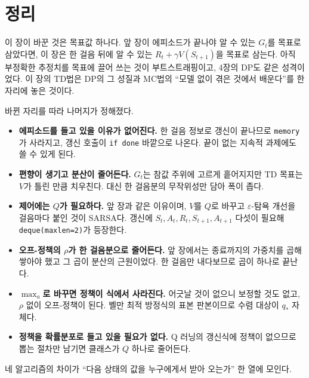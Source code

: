 \documentclass[11pt,a4paper]{article}
\begin{document}
\section{정리}
\label{sec:summary}

이 장이 바꾼 것은 목표값 하나다. 앞 장이 에피소드가 끝나야 알 수 있는 $G_t$를 목표로 삼았다면,
이 장은 한 걸음 뒤에 알 수 있는 $R_t + \gamma V(S_{t+1})$을 목표로 삼는다. 아직 부정확한 추정치를
목표에 끌어 쓰는 것이 부트스트래핑이고, 4장의 DP도 같은 성격이었다. 이 장의 TD법은 DP의 그
성질과 MC법의 ``모델 없이 겪은 것에서 배운다''를 한자리에 놓은 것이다.

바뀐 자리를 따라 나머지가 정해졌다.

\begin{itemize}[leftmargin=*,itemsep=3pt]
  \item \textbf{에피소드를 들고 있을 이유가 없어진다.} 한 걸음 정보로 갱신이 끝나므로
        \lstinline|memory|가 사라지고, 갱신 호출이 \lstinline|if done| 바깥으로 나온다. 끝이 없는
        지속적 과제에도 쓸 수 있게 된다.
  \item \textbf{편향이 생기고 분산이 줄어든다.} $G_t$는 참값 주위에 고르게 흩어지지만 TD 목표는
        $V$가 틀린 만큼 치우친다. 대신 한 걸음분의 무작위성만 담아 폭이 좁다.
  \item \textbf{제어에는 $Q$가 필요하다.} 앞 장과 같은 이유이며, $V$를 $Q$로 바꾸고
        $\varepsilon$-탐욕 개선을 걸음마다 붙인 것이 SARSA다. 갱신에
        $S_t, A_t, R_t, S_{t+1}, A_{t+1}$ 다섯이 필요해 \lstinline|deque(maxlen=2)|가 등장한다.
  \item \textbf{오프-정책의 $\rho$가 한 걸음분으로 줄어든다.} 앞 장에서는 종료까지의 가중치를
        곱해 쌓아야 했고 그 곱이 분산의 근원이었다. 한 걸음만 내다보므로 곱이 하나로 끝난다.
  \item \textbf{$\max_a$로 바꾸면 정책이 식에서 사라진다.} 어긋날 것이 없으니 보정할 것도 없고,
        $\rho$ 없이 오프-정책이 된다. 벨만 최적 방정식의 표본 판본이므로 수렴 대상이 $q_*$ 자체다.
  \item \textbf{정책을 확률분포로 들고 있을 필요가 없다.} Q 러닝의 갱신식에 정책이 없으므로
        뽑는 절차만 남기면 클래스가 $Q$ 하나로 줄어든다.
\end{itemize}

네 알고리즘의 차이가 ``다음 상태의 값을 누구에게서 받아 오는가'' 한 열에 모인다.
\end{document}
